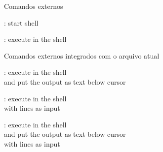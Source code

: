 \begin{frame}{Comandos externos}
    \begin{widedescription}
        \item {}: start shell
        \item {}: execute  in the shell
    \end{widedescription}
\end{frame}

\begin{frame}{Comandos externos integrados com o arquivo atual}
    \begin{widedescription}
        \item {}: execute  in the shell \\ and put the output as text below cursor
        \item {}: execute  in the shell \\ with \key{[range]} lines as input
        \item {}: execute  in the shell \\ and put the output as text below cursor \\ with \key{[range]} lines as input
    \end{widedescription}
\end{frame}